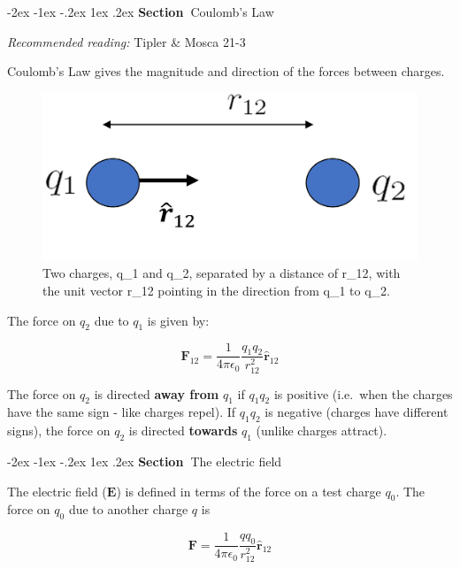 \documentclass[
]{book}
\makeatletter
\renewcommand\section{%
\@startsection{section}{1}{\z@}%
              {-2ex \@plus -1ex \@minus -.2ex}%
              {1ex \@plus .2ex}%
              {\sffamily\bfseries\large\noindent Section~}}
\numberwithin{equation}{section}
\makeatother
\begin{document}
\hypertarget{coulombs-law}{%
\section{Coulomb's Law}\label{coulombs-law}}

\emph{Recommended reading:} Tipler \& Mosca 21-3

Coulomb's Law gives the magnitude and direction of the forces between
charges.

\begin{figure}

{\centering \includegraphics[width=0.7\linewidth]{Figures/coulomb1} 

}

\caption{Two charges, q_1 and q_2, separated by a distance of r_12, with the unit vector r_12 pointing in the direction from q_1 to q_2.}\label{fig:coulomb1}
\end{figure}

The force on \(q_2\) due to \(q_1\) is given by:

\begin{equation}
\label{eq:coulombs}
\mathbf{F}_{12}= \frac{1}{4\pi \epsilon_0} \frac{q_1 q_2}{r_{12}^2} \hat{\mathbf{r}}_{12}
\end{equation}

The force on \(q_2\) is directed \textbf{away from} \(q_1\) if \(q_1 q_2\) is
positive (i.e.~when the charges have the same sign - like charges
repel). If \(q_1 q_2\) is negative (charges have different signs), the
force on \(q_2\) is directed \textbf{towards} \(q_1\) (unlike charges attract).

\hypertarget{the-electric-field}{%
\section{The electric field}\label{the-electric-field}}

The electric field (\(\mathbf{E}\)) is defined in terms of the force on a test
charge \(q_0\). The force on \(q_0\) due to another charge \(q\) is

\begin{equation}
\label{eq:forceQ0}
\mathbf{F} = \frac{1}{4\pi \epsilon_0} \frac{q q_0}{r_{12}^2} \hat{\mathbf{r}}_{12}
\end{equation}
\end{document}
